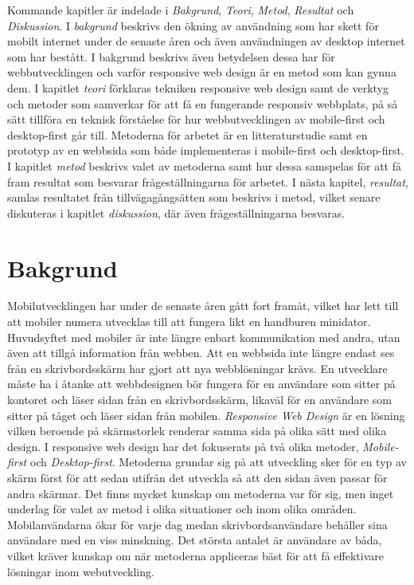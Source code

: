\documentclass[11pt]{article}
\begin{document}
Kommande kapitler är indelade i \textit{Bakgrund}, \textit{Teori}, \textit{Metod}, \textit{Resultat} och \textit{Diskussion}. I \textit{bakgrund} beskrivs den ökning av användning som har skett för mobilt internet under de senaste åren och även användningen av desktop internet som har bestått. I bakgrund beskrivs även betydelsen dessa har för webbutvecklingen och varför responsive web design är en metod som kan gynna dem. I kapitlet \textit{teori} förklaras tekniken responsive web design samt de verktyg och metoder som samverkar för att få en fungerande responsiv webbplats, på så sätt tillföra en teknisk förståelse för hur webbutvecklingen av mobile-first och desktop-first går till. Metoderna för arbetet är en litteraturstudie samt en prototyp av en webbsida som både implementeras i mobile-first och desktop-first. I kapitlet \textit{metod} beskrivs valet av metoderna samt hur dessa samspelas för att få fram resultat som besvarar frågeställningarna för arbetet. I nästa kapitel, \textit{resultat}, samlas resultatet från tillvägagångsätten som beskrivs i metod, vilket senare diskuteras i kapitlet \textit{diskussion}, där även frågeställningarna besvaras. 



\newpage


\section{Bakgrund}

Mobilutvecklingen har under de senaste åren gått fort framåt, vilket har lett till att mobiler numera utvecklas till att fungera likt en handburen minidator. Huvudsyftet med mobiler är inte längre enbart kommunikation med andra, utan även att tillgå information från webben. Att en webbsida inte längre endast ses från en skrivbordsskärm har gjort att nya webblösningar krävs. En utvecklare måste ha i åtanke att webbdesignen bör fungera för en användare som sitter på kontoret och läser sidan från en skrivbordsskärm, likaväl för en användare som sitter på tåget och läser sidan från mobilen. \textit{Responsive Web Design} är en lösning vilken beroende på skärmstorlek renderar samma sida på olika sätt med olika design. I responsive web design har det fokuserats på två olika metoder, \textit{Mobile-first} och \textit{Desktop-first}. Metoderna grundar sig på att utveckling sker för en typ av skärm först för att sedan utifrån det utveckla så att den sidan även passar för andra skärmar. Det finns mycket kunskap om metoderna var för sig, men inget underlag för valet av metod i olika situationer och inom olika områden. Mobilanvändarna ökar för varje dag medan skrivbordsanvändare behåller sina användare med en viss minskning. Det största antalet är användare av båda, vilket kräver kunskap om när metoderna appliceras bäst för att få effektivare lösningar inom webutveckling.
\end{document}

